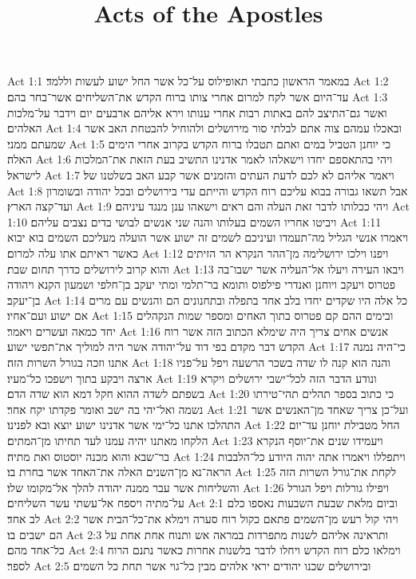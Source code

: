 

\title{Acts of the Apostles}

Act 1:1  במאמר הראשון כתבתי תאופילוס על־כל אשר החל ישוע לעשות וללמד׃
Act 1:2  עד־היום אשר לקח למרום אחרי צותו ברוח הקדש את־השליחים אשר־בחר בהם׃
Act 1:3  ואשר גם־התיצב להם באתות רבות אחרי ענותו וירא אליהם ארבעים יום וידבר על־מלכות האלהים׃
Act 1:4  ובאכלו עמהם צוה אתם לבלתי סור מירושלים ולהוחיל להבטחת האב אשר שמעתם ממני׃
Act 1:5  כי יוחנן הטביל במים ואתם תטבלו ברוח הקדש בקרוב אחרי הימים האלה׃
Act 1:6  ויהי בהתאספם יחדו וישאלהו לאמר אדנינו התשיב בעת הזאת את־המלכות לישראל׃
Act 1:7  ויאמר אליהם לא לכם לדעת העתים והזמנים אשר קבע האב בשלטנו של׃
Act 1:8  אבל תשאו גבורה בבוא עליכם רוח הקדש והייתם עדי בירושלים ובכל יהודה ובשומרון ועד־קצה הארץ׃
Act 1:9  ויהי ככלותו לדבר זאת העלה והם ראים וישאהו ענן מנגד עיניהם׃
Act 1:10  ויביטו אחריו השמים בעלותו והנה שני אנשים לבושי בדים נצבים עליהם׃
Act 1:11  ויאמרו אנשי הגליל מה־תעמדו ועיניכם לשמים זה ישוע אשר הועלה מעליכם השמים בוא יבוא כאשר ראיתם אתו עלה למרום׃
Act 1:12  ויפנו וילכו ירושלימה מן־ההר הנקרא הר הזיתים והוא קרוב לירושלים כדרך תחום שבת׃
Act 1:13  ויבאו העירה ויעלו אל־העליה אשר ישבו־בה פטרוס ויעקב ויוחנן ואנדרי פילפוס ותומא בר־תלמי ומתי יעקב בן־חלפי ושמעון הקנא ויהודה בן־יעקב׃
Act 1:14  כל אלה היו שקדים יחדו בלב אחד בתפלה ובתחנונים הם והנשים עם מרים אם ישוע ועם־אחיו׃
Act 1:15  ובימים ההם קם פטרוס בתוך האחים ומספר שמות הנקהלים יחד כמאה ועשרים ויאמר׃
Act 1:16  אנשים אחים צריך היה שימלא הכתוב הזה אשר רוח הקדש דבר מקדם בפי דוד על־יהודה אשר היה למוליך את־תפשי ישוע׃
Act 1:17  כי־היה נמנה אתנו וזכה בגורל השרות הזה׃
Act 1:18  והנה הוא קנה לו שדה בשכר הרשעה ויפל על־פניו ארצה ויבקע בתוך וישפכו כל־מעיו׃
Act 1:19  ונודע הדבר הזה לכל־ישבי ירושלים ויקרא בשפתם לשדה ההוא חקל דמא הוא שדה הדם׃
Act 1:20  כי כתוב בספר תהלים תהי־טירתו נשמה ואל־יהי בה ישב ואומר פקדתו יקח אחר׃
Act 1:21  ועל־כן צריך שאחד מן־האנשים אשר התהלכו אתנו כל־ימי אשר אדנינו ישוע יוצא ובא לפנינו׃
Act 1:22  החל מטבילת יוחנן עד־יום הלקחו מאתנו יהיה עמנו לעד תחיתו מן־המתים׃
Act 1:23  ויעמידו שנים את־יוסף הנקרא בר־שבא והוא מכנה יוסטוס ואת מתיה׃
Act 1:24  ויתפללו ויאמרו אתה יהוה היודע כל־הלבבות הראה־נא מן־השנים האלה את־האחד אשר בחרת בו׃
Act 1:25  לקחת את־גורל השרות הזה והשליחות אשר עבר ממנה יהודה להלך אל־מקומו שלו׃
Act 1:26  ויפילו גורלות ויפל הגורל על־מתיה ויספח אל־עשתי עשר השליחים׃
Act 2:1  וביום מלאת שבעת השבעות נאספו כלם לב אחד׃
Act 2:2  ויהי קול רעש מן־השמים פתאם כקול רוח סערה וימלא את־כל־הבית אשר הם ישבים בו׃
Act 2:3  ותראינה אליהם לשנות מתפרדות במראה אש ותנוח אחת אחת על כל־אחד מהם׃
Act 2:4  וימלאו כלם רוח הקדש ויחלו לדבר בלשנות אחרות כאשר נתנם הרוח לספר׃
Act 2:5  ובירושלים שכנו יהודים יראי אלהים מבין כל־גוי אשר תחת כל השמים׃
